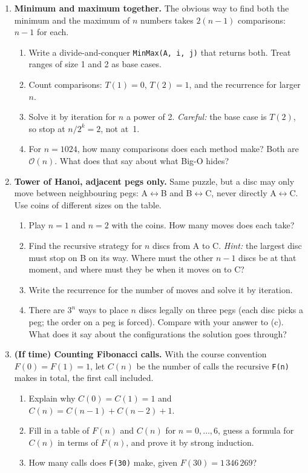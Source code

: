 \documentclass{fkt-notes}
\newcommand{\Oh}{\mathcal{O}}
\begin{document}
\begin{enumerate}[label=\textbf{4.\arabic*},leftmargin=2.5em]
  \item \textbf{Minimum and maximum together.} The obvious way to find both the minimum and the maximum of $n$ numbers takes $2(n-1)$ comparisons: $n-1$ for each.
    \begin{enumerate}[label=(\alph*)]
      \item Write a divide-and-conquer \texttt{MinMax(A, i, j)} that returns both. Treat ranges of size 1 and 2 as base cases.
      \item Count comparisons: $T(1)=0$, $T(2)=1$, and the recurrence for larger $n$.
      \item Solve it by iteration for $n$ a power of 2. \emph{Careful:} the base case is $T(2)$, so stop at $n/2^k=2$, not at~1.
      \item For $n=1024$, how many comparisons does each method make? Both are $\Oh(n)$. What does that say about what Big-O hides?
    \end{enumerate}
  \item \textbf{Tower of Hanoi, adjacent pegs only.} Same puzzle, but a disc may only move between neighbouring pegs: A$\leftrightarrow$B and B$\leftrightarrow$C, never directly A$\leftrightarrow$C. Use coins of different sizes on the table.
    \begin{enumerate}[label=(\alph*)]
      \item Play $n=1$ and $n=2$ with the coins. How many moves does each take?
      \item Find the recursive strategy for $n$ discs from A to C. \emph{Hint:} the largest disc must stop on B on its way. Where must the other $n-1$ discs be at that moment, and where must they be when it moves on to C?
      \item Write the recurrence for the number of moves and solve it by iteration.
      \item There are $3^n$ ways to place $n$ discs legally on three pegs (each disc picks a peg; the order on a peg is forced). Compare with your answer to (c). What does it say about the configurations the solution goes through?
    \end{enumerate}
  \item \textbf{(If time) Counting Fibonacci calls.} With the course convention $F(0)=F(1)=1$, let $C(n)$ be the number of calls the recursive \texttt{F(n)} makes in total, the first call included.
    \begin{enumerate}[label=(\alph*)]
      \item Explain why $C(0)=C(1)=1$ and $C(n)=C(n-1)+C(n-2)+1$.
      \item Fill in a table of $F(n)$ and $C(n)$ for $n=0,\dots,6$, guess a formula for $C(n)$ in terms of $F(n)$, and prove it by strong induction.
      \item How many calls does \texttt{F(30)} make, given $F(30)=1\,346\,269$?
    \end{enumerate}
\end{enumerate}
\end{document}
